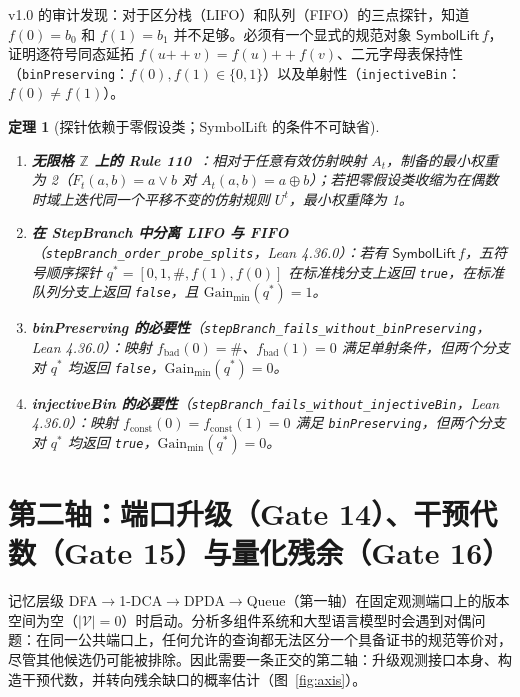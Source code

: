 \documentclass[11pt,a4paper,UTF8,fontset=fandol]{ctexart}
\newtheorem{theorem}{定理}[section]
\DeclareRobustCommand{\id}[1]{\nolinkurl{#1}}
\begin{document}
v1.0 的审计发现：对于区分栈（LIFO）和队列（FIFO）的三点探针，知道 $f(0)=b_0$ 和 $f(1)=b_1$ 并不足够。必须有一个显式的规范对象 $\mathsf{SymbolLift}\,f$，证明逐符号同态延拓 $f(u\mathbin{+\!\!+}v)=f(u)\mathbin{+\!\!+}f(v)$、二元字母表保持性（\id{binPreserving}：$f(0),f(1)\in\{0,1\}$）以及单射性（\id{injectiveBin}：$f(0)\ne f(1)$）。

\begin{theorem}[探针依赖于零假设类；SymbolLift 的条件不可缺省]
\begin{enumerate}
\item \textbf{无限格 $\mathbb{Z}$ 上的 Rule 110}~\cite[定理 4–5]{ms2}：相对于任意有效仿射映射 $A_t$，制备的最小权重为 2（$F_t(a,b)=a\lor b$ 对 $A_t(a,b)=a\oplus b$）；若把零假设类收缩为在偶数时域上迭代同一个平移不变的仿射规则 $U^t$，最小权重降为 1。
\item \textbf{在 StepBranch 中分离 LIFO 与 FIFO}（\id{stepBranch_order_probe_splits}，Lean 4.36.0）：若有 $\mathsf{SymbolLift}\,f$，五符号顺序探针 $q^*=[0,1,\#,f(1),f(0)]$ 在标准栈分支上返回 \id{true}，在标准队列分支上返回 \id{false}，且 $\mathrm{Gain}_{\min}(q^*)=1$。
\item \textbf{binPreserving 的必要性}（\id{stepBranch_fails_without_binPreserving}，Lean 4.36.0）：映射 $f_{\mathrm{bad}}(0)=\#$、$f_{\mathrm{bad}}(1)=0$ 满足单射条件，但两个分支对 $q^*$ 均返回 \id{false}，$\mathrm{Gain}_{\min}(q^*)=0$。
\item \textbf{injectiveBin 的必要性}（\id{stepBranch_fails_without_injectiveBin}，Lean 4.36.0）：映射 $f_{\mathrm{const}}(0)=f_{\mathrm{const}}(1)=0$ 满足 \id{binPreserving}，但两个分支对 $q^*$ 均返回 \id{true}，$\mathrm{Gain}_{\min}(q^*)=0$。
\end{enumerate}
\end{theorem}

\section{第二轴：端口升级（Gate 14）、干预代数（Gate 15）与量化残余（Gate 16）}

记忆层级 DFA$\to$1-DCA$\to$DPDA$\to$Queue（第一轴）在固定观测端口上的版本空间为空（$|\mathcal V|=0$）时启动。分析多组件系统和大型语言模型时会遇到对偶问题：在同一公共端口上，任何允许的查询都无法区分一个具备证书的规范等价对，尽管其他候选仍可能被排除。因此需要一条正交的第二轴：升级观测接口本身、构造干预代数，并转向残余缺口的概率估计（图~\ref{fig:axis}）。
\end{document}
